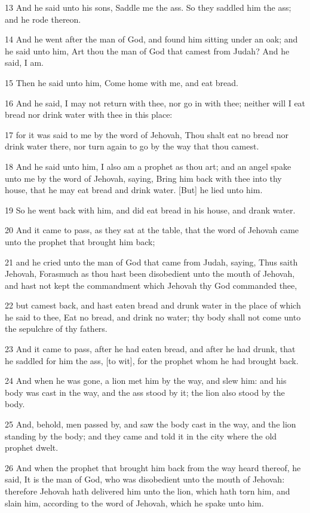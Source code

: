 \par 13 And he said unto his sons, Saddle me the ass. So they saddled him the ass; and he rode thereon.
\par 14 And he went after the man of God, and found him sitting under an oak; and he said unto him, Art thou the man of God that camest from Judah? And he said, I am.
\par 15 Then he said unto him, Come home with me, and eat bread.
\par 16 And he said, I may not return with thee, nor go in with thee; neither will I eat bread nor drink water with thee in this place:
\par 17 for it was said to me by the word of Jehovah, Thou shalt eat no bread nor drink water there, nor turn again to go by the way that thou camest.
\par 18 And he said unto him, I also am a prophet as thou art; and an angel spake unto me by the word of Jehovah, saying, Bring him back with thee into thy house, that he may eat bread and drink water. [But] he lied unto him.
\par 19 So he went back with him, and did eat bread in his house, and drank water.
\par 20 And it came to pass, as they sat at the table, that the word of Jehovah came unto the prophet that brought him back;
\par 21 and he cried unto the man of God that came from Judah, saying, Thus saith Jehovah, Forasmuch as thou hast been disobedient unto the mouth of Jehovah, and hast not kept the commandment which Jehovah thy God commanded thee,
\par 22 but camest back, and hast eaten bread and drunk water in the place of which he said to thee, Eat no bread, and drink no water; thy body shall not come unto the sepulchre of thy fathers.
\par 23 And it came to pass, after he had eaten bread, and after he had drunk, that he saddled for him the ass, [to wit], for the prophet whom he had brought back.
\par 24 And when he was gone, a lion met him by the way, and slew him: and his body was cast in the way, and the ass stood by it; the lion also stood by the body.
\par 25 And, behold, men passed by, and saw the body cast in the way, and the lion standing by the body; and they came and told it in the city where the old prophet dwelt.
\par 26 And when the prophet that brought him back from the way heard thereof, he said, It is the man of God, who was disobedient unto the mouth of Jehovah: therefore Jehovah hath delivered him unto the lion, which hath torn him, and slain him, according to the word of Jehovah, which he spake unto him.
